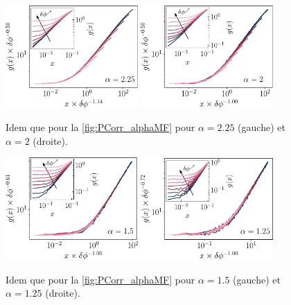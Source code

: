\begin{figure}[h]
\centering
\includegraphics[width=0.45\textwidth]{Chapitre3/Figures/Interpretation/PCorrMF/PCorr_rescaled_MF_alpha225.pdf}
\includegraphics[width=0.45\textwidth]{Chapitre3/Figures/Interpretation/PCorrMF/PCorr_rescaled_MF_alpha2.pdf}
\caption{Idem que pour la \autoref{fig:PCorr_alphaMF} pour $\alpha = 2.25$ (gauche) et $\alpha = 2$ (droite).}
\label{fig:PCorrAnnexe2}
\end{figure}

\begin{figure}[h]
\centering
\includegraphics[width=0.45\textwidth]{Chapitre3/Figures/Interpretation/PCorrMF/PCorr_rescaled_MF_alpha15.pdf}
\includegraphics[width=0.45\textwidth]{Chapitre3/Figures/Interpretation/PCorrMF/PCorr_rescaled_MF_alpha125.pdf}
\caption{Idem que pour la \autoref{fig:PCorr_alphaMF} pour $\alpha = 1.5$ (gauche) et $\alpha = 1.25$ (droite).}
\label{fig:PCorrAnnexe3}
\end{figure}

